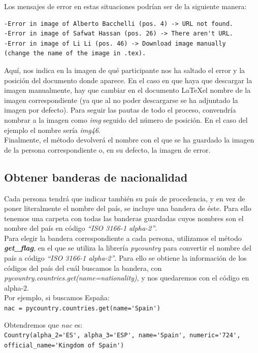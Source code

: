 \documentclass[a4paper, 12pt]{book}
\begin{document}
Los mensajes de error en estas situaciones podrían ser de la siguiente manera:
\begin{verbatim}
-Error in image of Alberto Bacchelli (pos. 4) -> URL not found.
-Error in image of Safwat Hassan (pos. 26) -> There aren't URL.
-Error in image of Li Li (pos. 46) -> Download image manually
(change the name of the image in .tex).
\end{verbatim}
Aquí, nos indica en la imagen de qué participante nos ha saltado el error y la posición del documento donde aparece. En el caso en que haya que descargar la imagen manualmente, hay que cambiar en el documento \LaTeX el nombre de la imagen correspondiente (ya que al no poder descargarse se ha adjuntado la imagen por defecto). Para seguir las pautas de todo el proceso, convendría nombrar a la imagen como \textit{img} seguido del número de posición. En el caso del ejemplo el nombre sería \textit{img46}.\\

Finalmente, el método devolverá el nombre con el que se ha guardado la imagen de la persona correspondiente o, en su defecto, la imagen de error.


\subsection{Obtener banderas de nacionalidad}
\label{subsec:banderas}
Cada persona tendrá que indicar también su país de procedencia, y en vez de poner literalmente el nombre del país, se incluye una bandera de éste. Para ello tenemos una carpeta con todas las banderas guardadas cuyos nombres son el nombre del país en código \textit{``ISO 3166-1 alpha-2''}.\\

Para elegir la bandera correspondiente a cada persona, utilizamos el método \textbf{\textit{get\_flag}}, en el que se utiliza la librería \textit{pycountry} para convertir el nombre del país a código \textit{``ISO 3166-1 alpha-2''}. Para ello se obtiene la información de los códigos del país del cuál buscamos la bandera, con \textit{pycountry.countries.get(name=nationality)}, y nos quedaremos con el código en alpha-2.\\

Por ejemplo, si buscamos España:\\
\verb"nac = pycountry.countries.get(name='Spain')"

Obtendremos que \textit{nac} es:\\
\verb"Country(alpha_2='ES', alpha_3='ESP', name='Spain', numeric='724'," 
\verb"        official_name='Kingdom of Spain')"
\end{document}
